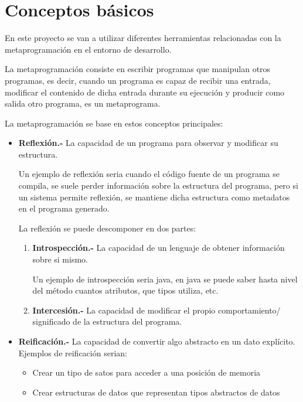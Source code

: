 \documentclass{cosas/tfg_domingo}
\begin{document}
\section{Conceptos básicos}
En este proyecto se van a utilizar diferentes herramientas relacionadas con la metaprogramación en el entorno de desarrollo.

La metaprogramación consiste en escribir programas que manipulan otros programas, es decir, cuando un programa es capaz de recibir una entrada, modificar el contenido de dicha entrada durante su ejecución y producir como salida otro programa, es un metaprograma.

La metaprogramación se base en estos conceptos principales:

\begin{itemize}
    \item \textbf{Reflexión.- } La capacidad de un programa para observar y modificar su estructura.
    
    Un ejemplo de reflexión seria cuando el código fuente de un programa se compila, se suele perder información sobre la estructura del programa, pero si un sistema permite reflexión, se mantiene dicha estructura como metadatos en el programa generado.
    
    La reflexión se puede descomponer en dos partes:
    
    \begin{enumerate}
        \item \textbf{Introspección.- } La capacidad de un lenguaje de obtener información sobre si mismo.
        
        Un ejemplo de introspección seria java, en java se puede saber hasta nivel del método cuantos atributos, que tipos utiliza, etc.
        \item \textbf{Intercesión.- } La capacidad de modificar el propio comportamiento/ significado de la estructura del programa.
    \end{enumerate}
    
    \item \textbf{Reificación.- } La capacidad de convertir algo abstracto en un dato explícito.
    Ejemplos de reificación serian:
    \begin{itemize}
        \item Crear un tipo de satos para acceder a una posición de memoria
        \item Crear estructuras de datos que representan tipos abstractos de datos
    \end{itemize}
\end{itemize}
\end{document}
